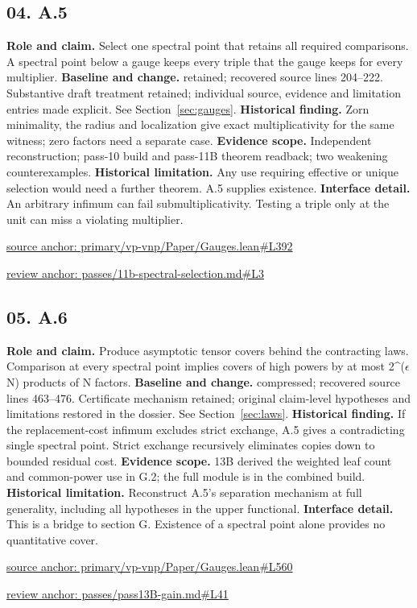 \documentclass[11pt,letterpaper]{article}
\theoremstyle{definition}\newtheorem{definition}[theorem]{Definition}\newtheorem{example}[theorem]{Example}
\theoremstyle{remark}\newtheorem{remark}[theorem]{Remark}
\begin{document}
\subsection*{04. A.5}
\textbf{Role and claim.} Select one spectral point that retains all required comparisons. A spectral point below a gauge keeps every triple that the gauge keeps for every multiplier.
\textbf{Baseline and change.} retained; recovered source lines 204--222. Substantive draft treatment retained; individual source, evidence and limitation entries made explicit. See Section~\ref{sec:gauges}.
\textbf{Historical finding.} Zorn minimality, the radius and localization give exact multiplicativity for the same witness; zero factors need a separate case.
\textbf{Evidence scope.} Independent reconstruction; pass-10 build and pass-11B theorem readback; two weakening counterexamples.
\textbf{Historical limitation.} Any use requiring effective or unique selection would need a further theorem. A.5 supplies existence.
\textbf{Interface detail.} An arbitrary infimum can fail submultiplicativity. Testing a triple only at the unit can miss a violating multiplier.
\par\href{https://github.com/nousentllc/VP-VNP-Review/blob/8a7976933b6b2b4ffda1ad3a0dfb5fc6b6f023e8/primary/vp-vnp/Paper/Gauges.lean\#L392}{source anchor: primary/vp-vnp/Paper/Gauges.lean\#L392}
\par\href{https://github.com/nousentllc/VP-VNP-Review/blob/8a7976933b6b2b4ffda1ad3a0dfb5fc6b6f023e8/passes/11b-spectral-selection.md\#L3}{review anchor: passes/11b-spectral-selection.md\#L3}
\goodbreak
\subsection*{05. A.6}
\textbf{Role and claim.} Produce asymptotic tensor covers behind the contracting laws. Comparison at every spectral point implies covers of high powers by at most 2\textasciicircum{}(\ensuremath{\epsilon}N) products of N factors.
\textbf{Baseline and change.} compressed; recovered source lines 463--476. Certificate mechanism retained; original claim-level hypotheses and limitations restored in the dossier. See Section~\ref{sec:laws}.
\textbf{Historical finding.} If the replacement-cost infimum excludes strict exchange, A.5 gives a contradicting single spectral point. Strict exchange recursively eliminates copies down to bounded residual cost.
\textbf{Evidence scope.} 13B derived the weighted leaf count and common-power use in G.2; the full module is in the combined build.
\textbf{Historical limitation.} Reconstruct A.5's separation mechanism at full generality, including all hypotheses in the upper functional.
\textbf{Interface detail.} This is a bridge to section G. Existence of a spectral point alone provides no quantitative cover.
\par\href{https://github.com/nousentllc/VP-VNP-Review/blob/8a7976933b6b2b4ffda1ad3a0dfb5fc6b6f023e8/primary/vp-vnp/Paper/Gauges.lean\#L560}{source anchor: primary/vp-vnp/Paper/Gauges.lean\#L560}
\par\href{https://github.com/nousentllc/VP-VNP-Review/blob/8a7976933b6b2b4ffda1ad3a0dfb5fc6b6f023e8/passes/pass13B-gain.md\#L41}{review anchor: passes/pass13B-gain.md\#L41}
\goodbreak
\end{document}
